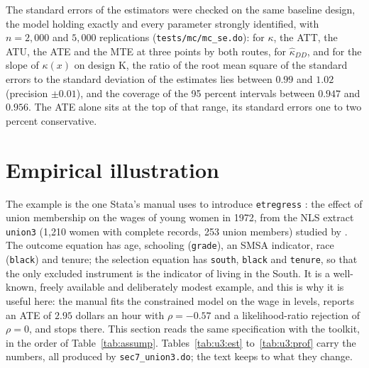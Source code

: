 \documentclass[11pt,a4paper]{article}
\theoremstyle{plain}
\theoremstyle{definition}
\theoremstyle{remark}
\newcommand{\1}{\mathbf{1}}
\newcommand{\cmd}[1]{\texttt{#1}}
\newcommand{\kX}{\kappa(x)}
\begin{document}
The standard errors of the estimators were checked on the same baseline
design, the model holding exactly and every parameter strongly
identified, with $n=2{,}000$ and $5{,}000$ replications
(\cmd{tests/mc/mc\_se.do}): for $\kappa$, the ATT, the ATU, the ATE and
the MTE at three points by both routes, for $\hat\kappa_{DD}$, and for the
slope of $\kX$ on design K, the ratio of the root mean square of the
standard errors to the standard deviation of the estimates lies between
$0.99$ and $1.02$ (precision $\pm0.01$), and the coverage of the 95
percent intervals between $0.947$ and $0.956$. The ATE alone sits at the
top of that range, its standard errors one to two percent conservative.

\section{Empirical illustration}\label{sec:emp}
The example is the one Stata's manual uses to introduce \cmd{etregress}
\citep{statacorp2025}: the effect of union membership on the wages of
young women in 1972, from the NLS extract \cmd{union3} (1,210 women with
complete records, 253 union members) studied by \citet{vella1998}. The
outcome equation has age, schooling (\cmd{grade}), an SMSA indicator,
race (\cmd{black}) and tenure; the selection equation has \cmd{south},
\cmd{black} and \cmd{tenure}, so that the only excluded instrument is
the indicator of living in the South. It is a well-known, freely
available and deliberately modest example, and this is why it is
useful here: the manual fits the constrained model on the wage in
levels, reports an ATE of $2.95$ dollars an hour with $\rho=-0.57$ and
a likelihood-ratio rejection of $\rho=0$, and stops there. This
section reads the same specification with the toolkit, in the order of
Table~\ref{tab:assump}. Tables~\ref{tab:u3:est} to~\ref{tab:u3:prof}
carry the numbers, all produced by \cmd{sec7\_union3.do}; the text
keeps to what they change.
\end{document}
